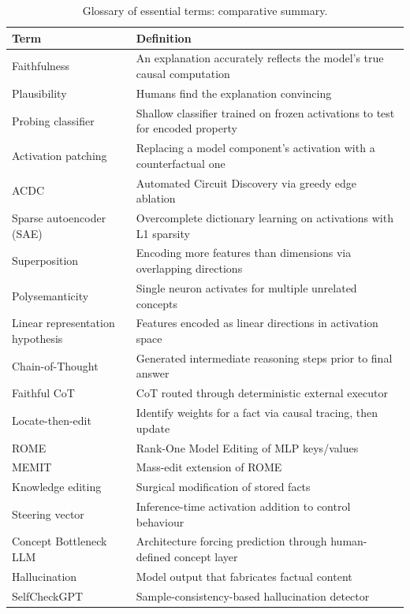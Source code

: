 \documentclass{article}
\begin{document}
\begin{table}[t]
\centering
\caption{Glossary of essential terms: comparative summary.}
\label{tab:glossary-of-essential-terms}
\begin{tabular}{>{\raggedright\arraybackslash}p{0.3186\linewidth}
  >{\raggedright\arraybackslash}p{0.6814\linewidth}}
\toprule
Term & Definition \\
\midrule
Faithfulness & An explanation accurately reflects the model's true causal computation \\
Plausibility & Humans find the explanation convincing \\
Probing classifier & Shallow classifier trained on frozen activations to test for encoded property \\
Activation patching & Replacing a model component's activation with a counterfactual one \\
ACDC & Automated Circuit Discovery via greedy edge ablation \\
Sparse autoencoder (SAE) & Overcomplete dictionary learning on activations with L1 sparsity \\
Superposition & Encoding more features than dimensions via overlapping directions \\
Polysemanticity & Single neuron activates for multiple unrelated concepts \\
Linear representation hypothesis & Features encoded as linear directions in activation space \\
Chain-of-Thought & Generated intermediate reasoning steps prior to final answer \\
Faithful CoT & CoT routed through deterministic external executor \\
Locate-then-edit & Identify weights for a fact via causal tracing, then update \\
ROME & Rank-One Model Editing of MLP keys/values \\
MEMIT & Mass-edit extension of ROME \\
Knowledge editing & Surgical modification of stored facts \\
Steering vector & Inference-time activation addition to control behaviour \\
Concept Bottleneck LLM & Architecture forcing prediction through human-defined concept layer \\
Hallucination & Model output that fabricates factual content \\
SelfCheckGPT & Sample-consistency-based hallucination detector \\

\end{tabular}
\end{table}
\end{document}
